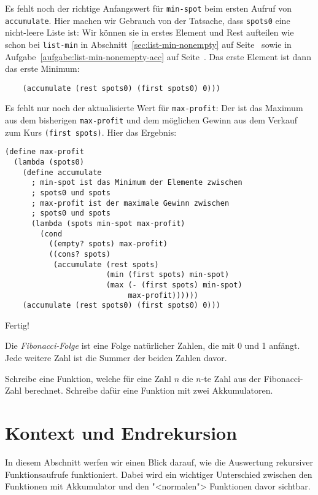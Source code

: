 %
Es fehlt noch der richtige Anfangswert für \lstinline{min-spot} beim
ersten Aufruf von \lstinline{accumulate}.  Hier machen wir Gebrauch
von der Tatsache, dass \lstinline{spots0} eine nicht-leere Liste ist:
Wir können sie in erstes Element und Rest aufteilen wie schon bei
\lstinline{list-min} in Abschnitt~\ref{sec:list-min-nonempty} auf
Seite~\pageref{sec:list-min-nonempty} sowie in
Aufgabe~\ref{aufgabe:list-min-nonemepty-acc} auf
Seite~\pageref{aufgabe:list-min-nonemepty-acc}.  Das erste Element ist
dann das erste Minimum:
%
\begin{lstlisting}
    (accumulate (rest spots0) (first spots0) 0)))
\end{lstlisting}
%
Es fehlt nur noch der aktualisierte Wert für \lstinline{max-profit}:
Der ist das Maximum aus dem bisherigen \lstinline{max-profit} und dem
möglichen Gewinn aus dem Verkauf zum Kurs \lstinline{(first spots)}.
Hier das Ergebnis:
%
\begin{lstlisting}
(define max-profit
  (lambda (spots0)
    (define accumulate
      ; min-spot ist das Minimum der Elemente zwischen
      ; spots0 und spots
      ; max-profit ist der maximale Gewinn zwischen
      ; spots0 und spots
      (lambda (spots min-spot max-profit)
        (cond
          ((empty? spots) max-profit)
          ((cons? spots)
           (accumulate (rest spots)
                       (min (first spots) min-spot)
                       (max (- (first spots) min-spot)
                            max-profit))))))
    (accumulate (rest spots0) (first spots0) 0)))
\end{lstlisting}
%
Fertig!

\begin{aufgabeinline}
  Die \textit{Fibonacci-Folge} ist eine Folge natürlicher Zahlen, die
  mit 0 und 1 anfängt.  Jede weitere Zahl ist die Summer der beiden
  Zahlen davor.

  Schreibe eine Funktion, welche für eine Zahl $n$ die $n$-te Zahl aus
  der Fibonacci-Zahl berechnet.  Schreibe dafür eine Funktion
  mit zwei Akkumulatoren.
\end{aufgabeinline}

\section{Kontext und Endrekursion}
\label{sec:iteration}

In diesem Abschnitt werfen wir einen Blick darauf, wie  
die Auswertung rekursiver Funktionsaufrufe funktioniert.  Dabei
wird ein wichtiger Unterschied zwischen den Funktionen mit Akkumulator
und den "<normalen"> Funktionen davor sichtbar.

